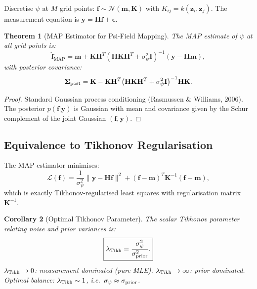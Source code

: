 \documentclass[aps,prd,twocolumn,superscriptaddress,nofootinbib]{revtex4-2}
\newcommand{\MAP}{\mathrm{MAP}}
\newtheorem{theorem}{Theorem}
\newtheorem{corollary}[theorem]{Corollary}
\begin{document}
Discretise $\psi$ at $M$ grid points:
$\mathbf{f} \sim \mathcal{N}(\mathbf{m}, \mathbf{K})$ with
$K_{ij} = k(\mathbf{z}_i,\mathbf{z}_j)$.  The measurement equation is
$\mathbf{y} = \mathbf{H}\mathbf{f} + \boldsymbol{\epsilon}$.

\begin{theorem}[MAP Estimator for Psi-Field Mapping]
\label{thm:map}
The MAP estimate of $\psi$ at all grid points is:
\begin{equation}
\boxed{
\hat{\mathbf{f}}_{\MAP} = \mathbf{m} + \mathbf{K}\mathbf{H}^T
\!\left(\mathbf{H}\mathbf{K}\mathbf{H}^T + \sigma_\psi^2\mathbf{I}\right)^{-1}\!
(\mathbf{y} - \mathbf{H}\mathbf{m}),
}
\label{eq:map}
\end{equation}
with posterior covariance:
\begin{equation}
\boldsymbol{\Sigma}_{\rm post} = \mathbf{K} - \mathbf{K}\mathbf{H}^T
\!\left(\mathbf{H}\mathbf{K}\mathbf{H}^T + \sigma_\psi^2\mathbf{I}\right)^{-1}\!
\mathbf{H}\mathbf{K}.
\label{eq:post-cov}
\end{equation}
\end{theorem}

\begin{proof}
Standard Gaussian process conditioning (Rasmussen \& Williams, 2006).
The posterior $p(\mathbf{f}|\mathbf{y})$ is Gaussian with mean and
covariance given by the Schur complement of the joint Gaussian
$(\mathbf{f},\mathbf{y})$.
\end{proof}

\subsection{Equivalence to Tikhonov Regularisation}

The MAP estimator minimises:
\begin{equation}
\mathcal{L}(\mathbf{f}) = \frac{1}{\sigma_\psi^2}\|\mathbf{y} - \mathbf{H}\mathbf{f}\|^2
+ (\mathbf{f}-\mathbf{m})^T\mathbf{K}^{-1}(\mathbf{f}-\mathbf{m}),
\label{eq:tikhonov}
\end{equation}
which is exactly Tikhonov-regularised least squares with regularisation
matrix $\mathbf{K}^{-1}$.

\begin{corollary}[Optimal Tikhonov Parameter]
\label{cor:tikhonov}
The scalar Tikhonov parameter relating noise and prior variances is:
\begin{equation}
\boxed{
\lambda_{\rm Tikh} = \frac{\sigma_\psi^2}{\sigma_{\rm prior}^2}.
}
\label{eq:lambda-tikh}
\end{equation}
$\lambda_{\rm Tikh} \to 0$: measurement-dominated (pure MLE).
$\lambda_{\rm Tikh} \to \infty$: prior-dominated.
Optimal balance: $\lambda_{\rm Tikh} \sim 1$, i.e.\
$\sigma_\psi \approx \sigma_{\rm prior}$.
\end{corollary}
\end{document}
